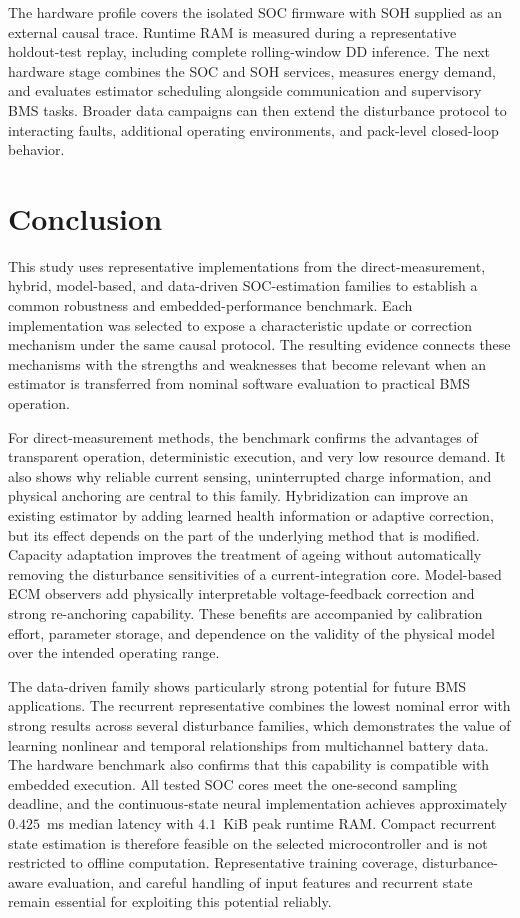 \documentclass[review,nopreprintline]{elsarticle}
\begin{document}
The hardware profile covers the isolated SOC firmware with SOH supplied as an external causal trace. Runtime RAM is measured during a representative holdout-test replay, including complete rolling-window DD inference. The next hardware stage combines the SOC and SOH services, measures energy demand, and evaluates estimator scheduling alongside communication and supervisory BMS tasks. Broader data campaigns can then extend the disturbance protocol to interacting faults, additional operating environments, and pack-level closed-loop behavior.

\section{Conclusion}
This study uses representative implementations from the direct-measurement, hybrid, model-based, and data-driven SOC-estimation families to establish a common robustness and embedded-performance benchmark. Each implementation was selected to expose a characteristic update or correction mechanism under the same causal protocol. The resulting evidence connects these mechanisms with the strengths and weaknesses that become relevant when an estimator is transferred from nominal software evaluation to practical BMS operation.

For direct-measurement methods, the benchmark confirms the advantages of transparent operation, deterministic execution, and very low resource demand. It also shows why reliable current sensing, uninterrupted charge information, and physical anchoring are central to this family. Hybridization can improve an existing estimator by adding learned health information or adaptive correction, but its effect depends on the part of the underlying method that is modified. Capacity adaptation improves the treatment of ageing without automatically removing the disturbance sensitivities of a current-integration core. Model-based ECM observers add physically interpretable voltage-feedback correction and strong re-anchoring capability. These benefits are accompanied by calibration effort, parameter storage, and dependence on the validity of the physical model over the intended operating range.

The data-driven family shows particularly strong potential for future BMS applications. The recurrent representative combines the lowest nominal error with strong results across several disturbance families, which demonstrates the value of learning nonlinear and temporal relationships from multichannel battery data. The hardware benchmark also confirms that this capability is compatible with embedded execution. All tested SOC cores meet the one-second sampling deadline, and the continuous-state neural implementation achieves approximately $0.425$~ms median latency with $4.1$~KiB peak runtime RAM. Compact recurrent state estimation is therefore feasible on the selected microcontroller and is not restricted to offline computation. Representative training coverage, disturbance-aware evaluation, and careful handling of input features and recurrent state remain essential for exploiting this potential reliably.
\end{document}
